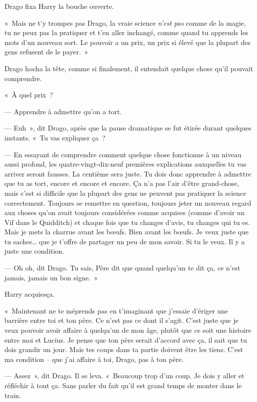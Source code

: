 Drago fixa Harry la bouche ouverte.

«~Mais ne t'y trompes pas Drago, la vraie science \emph{n'est pas} comme de la magie, tu ne peux pas la pratiquer et t'en aller inchangé, comme quand tu apprends les mots d'un nouveau sort. Le pouvoir a un prix, un prix si élevé que la plupart des gens refusent de le payer.~»

Drago hocha la tête, comme si finalement, il entendait quelque chose qu'il pouvait comprendre.

«~À quel prix~?

--- Apprendre à admettre qu'on a tort.

--- Euh~», dit Drago, après que la pause dramatique se fut étirée durant quelques instants. «~Tu vas expliquer ça~?

--- En essayant de comprendre comment quelque chose fonctionne à un niveau aussi profond, les quatre-vingt-dix-neuf premières explications auxquelles tu vas arriver seront fausses. La centième sera juste. Tu dois donc apprendre à admettre que tu as tort, encore et encore et encore. Ça n'a pas l'air d'être grand-chose, mais c'est si difficile que la plupart des gens ne peuvent pas pratiquer la science correctement. Toujours se remettre en question, toujours jeter un nouveau regard aux choses qu'on avait toujours considérées comme acquises (comme d'avoir un Vif dans le Quidditch) et chaque fois que tu changes d'avis, tu changes qui tu es. Mais je mets la charrue avant les bœufs. Bien avant les bœufs. Je veux juste que tu saches… que je t'offre de partager un peu de mon savoir. Si tu le veux. Il y a juste une condition.

--- Oh oh, dit Drago. Tu sais, Père dit que quand quelqu'un te dit ça, ce n'est jamais, jamais un bon signe.~»

Harry acquiesça.

«~Maintenant ne te méprends pas en t'imaginant que j'essaie d'ériger une barrière entre toi et ton père. Ce n'est pas ce dont il s'agit. C'est juste que je veux pouvoir avoir affaire à quelqu'un de mon âge, plutôt que ce soit une histoire entre moi et Lucius. Je pense que ton père serait d'accord avec ça, il sait que tu dois grandir un jour. Mais tes coups dans ta partie doivent être les tiens. C'est ma condition -- que j'ai affaire à toi, Drago, pas à ton père.

--- Assez~», dit Drago. Il se leva. «~Beaucoup trop d'un coup. Je dois y aller et réfléchir à tout ça. Sans parler du fait qu'il est grand temps de monter dans le train.

